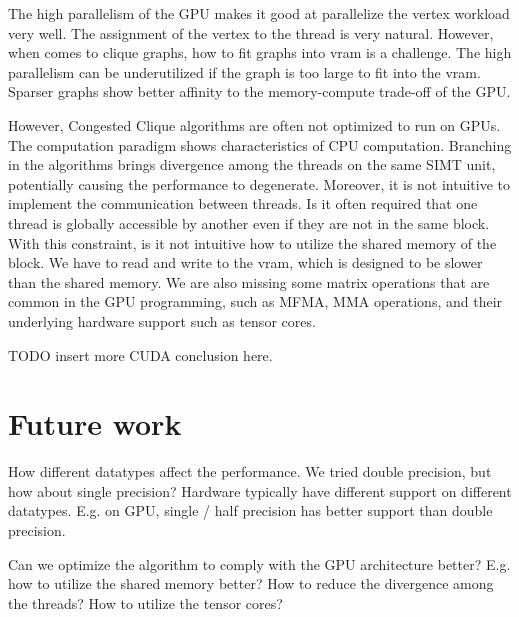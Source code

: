 \documentclass[english, 12pt, a4paper, elec, utf8, a-2b, online]{aaltothesis}
\begin{document}
The high parallelism of the GPU makes it good at parallelize the vertex workload very well. The assignment of the vertex to the thread is very natural. However, when comes to clique graphs, how to fit graphs into vram is a challenge. The high parallelism can be underutilized if the graph is too large to fit into the vram. Sparser graphs show better affinity to the memory-compute trade-off of the GPU.

However, Congested Clique algorithms are often not optimized to run on GPUs. The computation paradigm shows characteristics of CPU computation. Branching in the algorithms brings divergence among the threads on the same SIMT unit, potentially causing the performance to degenerate. Moreover, it is not intuitive to implement the communication between threads. Is it often required that one thread is globally accessible by another even if they are not in the same block. With this constraint, is it not intuitive how to utilize the shared memory of the block. We have to read and write to the vram, which is designed to be slower than the shared memory. We are also missing some matrix operations that are common in the GPU programming, such as MFMA, MMA operations, and their underlying hardware support such as tensor cores.

TODO insert more CUDA conclusion here.

\clearpage
\section{Future work}
\label{sec:future}
How different datatypes affect the performance. We tried double precision, but how about single precision? Hardware typically have different support on different datatypes. E.g. on GPU, single / half precision has better support than double precision.

Can we optimize the algorithm to comply with the GPU architecture better? E.g. how to utilize the shared memory better? How to reduce the divergence among the threads? How to utilize the tensor cores?

\clearpage
\thesisbibliography
\end{document}
